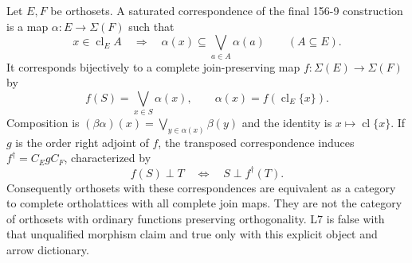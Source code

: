 \begin{theorem}
\label{SA21-A22}
Let $E,F$ be orthosets. A saturated correspondence of the final
156-9 construction is a map $\alpha:E\to\Sigma(F)$ such that
\begin{equation}\label{eq:bond}
 x\in\operatorname{cl}_E A\quad\Longrightarrow\quad
 \alpha(x)\subseteq\bigvee_{a\in A}\alpha(a)
 \qquad(A\subseteq E).
\end{equation}
It corresponds bijectively to a complete join-preserving map
$f:\Sigma(E)\to\Sigma(F)$ by
\[
 f(S)=\bigvee_{x\in S}\alpha(x),\qquad
 \alpha(x)=f(\operatorname{cl}_E\{x\}).
\]
Composition is
$(\beta\alpha)(x)=\bigvee_{y\in\alpha(x)}\beta(y)$ and the identity
is $x\mapsto\operatorname{cl}\{x\}$.
If $g$ is the order right adjoint of $f$, the transposed
correspondence induces
$f^\dagger=C_EgC_F$, characterized by
\[
 f(S)\perp T\quad\Longleftrightarrow\quad S\perp f^\dagger(T).
\]
Consequently orthosets with these correspondences are equivalent
as a category to complete ortholattices with all complete join maps.
They are not the category of orthosets with ordinary functions
preserving orthogonality. L7 is false with that unqualified morphism
claim and true only with this explicit object and arrow dictionary.
\end{theorem}
